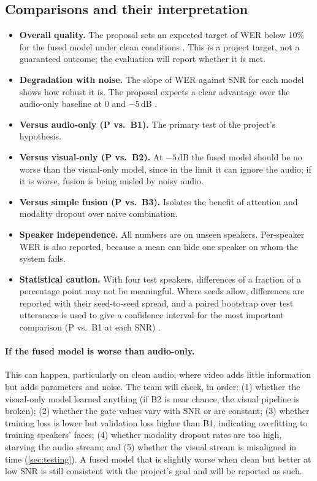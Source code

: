 \subsection{Comparisons and their interpretation}
\begin{itemize}
  \item \textbf{Overall quality.} The proposal sets an expected target of WER below
        10\% for the fused model under clean conditions \spec. This is a project
        target, not a guaranteed outcome; the evaluation will report whether it
        is met.
  \item \textbf{Degradation with noise.} The slope of WER against SNR for each model
        shows how robust it is. The proposal expects a clear advantage over the
        audio-only baseline at 0 and $-5$\,dB \spec.
  \item \textbf{Versus audio-only (P vs.\ B1).} The primary test of the project's
        hypothesis.
  \item \textbf{Versus visual-only (P vs.\ B2).} At $-5$\,dB the fused model should be
        no worse than the visual-only model, since in the limit it can ignore the
        audio; if it is worse, fusion is being misled by noisy audio.
  \item \textbf{Versus simple fusion (P vs.\ B3).} Isolates the benefit of attention
        and modality dropout over naive combination.
  \item \textbf{Speaker independence.} All numbers are on unseen speakers.
        Per-speaker WER is also reported, because a mean can hide one speaker
        on whom the system fails.
  \item \textbf{Statistical caution.} With four test speakers, differences of a
        fraction of a percentage point may not be meaningful. Where seeds allow,
        differences are reported with their seed-to-seed spread, and a paired
        bootstrap over test utterances is used to give a confidence interval
        for the most important comparison (P vs.\ B1 at each SNR) \rec.
\end{itemize}

\paragraph{If the fused model is worse than audio-only.} This can happen,
particularly on clean audio, where video adds little information but adds
parameters and noise. The team will check, in order: (1) whether the visual-only
model learned anything (if B2 is near chance, the visual pipeline is broken);
(2) whether the gate values vary with SNR or are constant; (3) whether training
loss is lower but validation loss higher than B1, indicating overfitting to
training speakers' faces; (4) whether modality dropout rates are too high,
starving the audio stream; and (5) whether the visual stream is misaligned in
time (\cref{sec:testing}). A fused model that is slightly worse when clean but
better at low SNR is still consistent with the project's goal and will be
reported as such.

